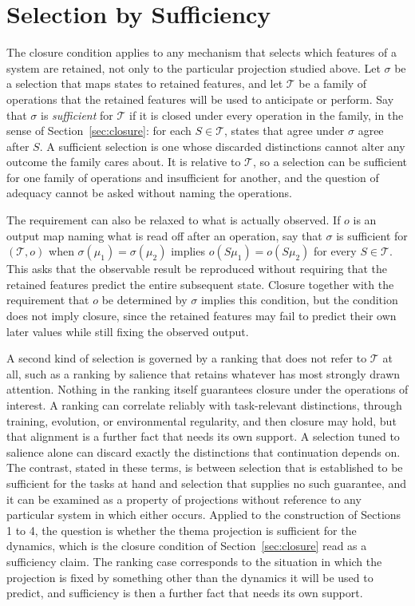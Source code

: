 \documentclass[11pt, a4paper]{article}
\theoremstyle{plain}
\theoremstyle{definition}
\theoremstyle{remark}
\begin{document}
\section{Selection by Sufficiency}

The closure condition applies to any mechanism that selects which features of a system are retained, not only to the particular projection studied above.
Let $\sigma$ be a selection that maps states to retained features, and let $\mathcal{T}$ be a family of operations that the retained features will be used to anticipate or perform. Say that $\sigma$ is \emph{sufficient} for $\mathcal{T}$ if it is closed under every operation in the family, in the sense of Section~\ref{sec:closure}: for each $S \in \mathcal{T}$, states that agree under $\sigma$ agree after $S$. A sufficient selection is one whose discarded distinctions cannot alter any outcome the family cares about. It is relative to $\mathcal{T}$, so a selection can be sufficient for one family of operations and insufficient for another, and the question of adequacy cannot be asked without naming the operations.

The requirement can also be relaxed to what is actually observed. If $o$ is an output map naming what is read off after an operation, say that $\sigma$ is sufficient for $(\mathcal{T}, o)$ when $\sigma(\mu_1) = \sigma(\mu_2)$ implies $o(S\mu_1) = o(S\mu_2)$ for every $S \in \mathcal{T}$. This asks that the observable result be reproduced without requiring that the retained features predict the entire subsequent state. Closure together with the requirement that $o$ be determined by $\sigma$ implies this condition, but the condition does not imply closure, since the retained features may fail to predict their own later values while still fixing the observed output.

A second kind of selection is governed by a ranking that does not refer to $\mathcal{T}$ at all, such as a ranking by salience that retains whatever has most strongly drawn attention. Nothing in the ranking itself guarantees closure under the operations of interest. A ranking can correlate reliably with task-relevant distinctions, through training, evolution, or environmental regularity, and then closure may hold, but that alignment is a further fact that needs its own support. A selection tuned to salience alone can discard exactly the distinctions that continuation depends on. The contrast, stated in these terms, is between selection that is established to be sufficient for the tasks at hand and selection that supplies no such guarantee, and it can be examined as a property of projections without reference to any particular system in which either occurs. Applied to the construction of Sections 1 to 4, the question is whether the thema projection is sufficient for the dynamics, which is the closure condition of Section~\ref{sec:closure} read as a sufficiency claim. The ranking case corresponds to the situation in which the projection is fixed by something other than the dynamics it will be used to predict, and sufficiency is then a further fact that needs its own support.
\end{document}
